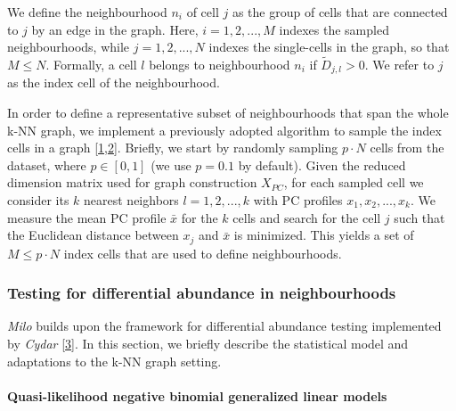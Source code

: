 \documentclass[
]{article}
\begin{document}
We define the neighbourhood \(n_i\) of cell \(j\) as the group of cells that are connected to \(j\) by an edge in the graph. Here, \(i=1,2,...,M\) indexes the sampled neighbourhoods, while \(j=1,2,...,N\) indexes the single-cells in the graph, so that \(M \leq N\).
Formally, a cell \(l\) belongs to neighbourhood \(n_i\) if \(\tilde{D}_{j,l} > 0\). We refer to \(j\) as the index cell of the neighbourhood.

In order to define a representative subset of neighbourhoods that span the whole k-NN graph, we implement a previously adopted algorithm to sample the index cells in a graph {[}\protect\hyperlink{ref-gutTrajectoriesCellcycleProgression2015}{1},\protect\hyperlink{ref-settyWishboneIdentifiesBifurcating2016}{2}{]}.
Briefly, we start by randomly sampling \(p \cdot N\) cells from the dataset, where \(p \in [0,1]\) (we use \(p = 0.1\) by default).
Given the reduced dimension matrix used for graph construction \(X_{PC}\), for each sampled cell we consider its \(k\) nearest neighbors \(l = 1,2,...,k\) with PC profiles \({x_1, x_2, ... , x_k}\). We measure the mean PC profile \(\bar{x}\) for the \(k\) cells and search for the cell \(j\) such that the Euclidean distance between \(x_j\) and \(\bar{x}\) is minimized. This yields a set of \(M \leq p \cdot N\) index cells that are used to define neighbourhoods.

\hypertarget{testing-for-differential-abundance-in-neighbourhoods}{%
\subsubsection{Testing for differential abundance in neighbourhoods}\label{testing-for-differential-abundance-in-neighbourhoods}}

\emph{Milo} builds upon the framework for differential abundance testing implemented by \emph{Cydar} {[}\protect\hyperlink{ref-lunTestingDifferentialAbundance2017}{3}{]}. In this section, we briefly describe the statistical model and adaptations to the k-NN graph setting.

\hypertarget{quasi-likelihood-negative-binomial-generalized-linear-models}{%
\paragraph*{Quasi-likelihood negative binomial generalized linear models}\label{quasi-likelihood-negative-binomial-generalized-linear-models}}
\end{document}
